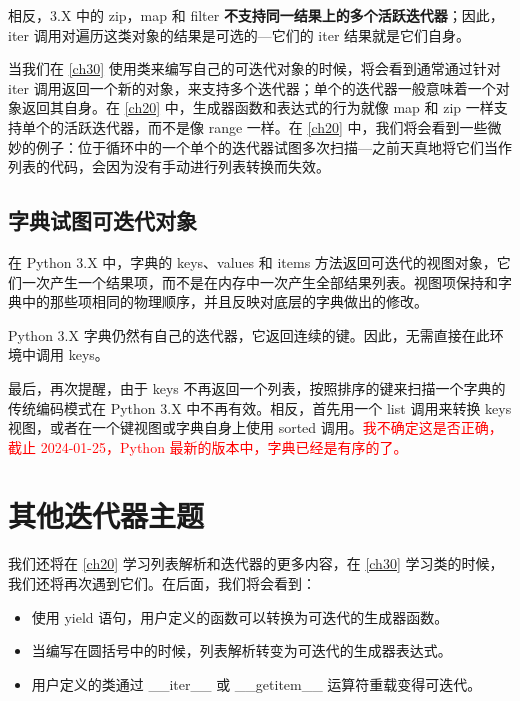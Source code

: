 相反，3.X 中的 zip，map 和 filter \textbf{不支持同一结果上的多个活跃迭代器}；因此，iter 调用对遍历这类对象的结果是可选的---它们的 iter 结果就是它们自身。

当我们在 \autoref{ch30} 使用类来编写自己的可迭代对象的时候，将会看到通常通过针对 iter 调用返回一个新的对象，来支持多个迭代器；单个的迭代器一般意味着一个对象返回其自身。在 \autoref{ch20} 中，生成器函数和表达式的行为就像 map 和 zip 一样支持单个的活跃迭代器，而不是像 range 一样。在 \autoref{ch20} 中，我们将会看到一些微妙的例子：位于循环中的一个单个的迭代器试图多次扫描---之前天真地将它们当作列表的代码，会因为没有手动进行列表转换而失效。
\subsection{字典试图可迭代对象}
在 Python 3.X 中，字典的 keys、values 和 items 方法返回可迭代的视图对象，它们一次产生一个结果项，而不是在内存中一次产生全部结果列表。视图项保持和字典中的那些项相同的物理顺序，并且反映对底层的字典做出的修改。

Python 3.X 字典仍然有自己的迭代器，它返回连续的键。因此，无需直接在此环境中调用 keys。

最后，再次提醒，由于 keys 不再返回一个列表，按照排序的键来扫描一个字典的传统编码模式在 Python 3.X 中不再有效。相反，首先用一个 list 调用来转换 keys 视图，或者在一个键视图或字典自身上使用 sorted 调用。\textcolor{red}{我不确定这是否正确，截止 2024-01-25，Python 最新的版本中，字典已经是有序的了。}
\section{其他迭代器主题}
我们还将在 \autoref{ch20} 学习列表解析和迭代器的更多内容，在 \autoref{ch30} 学习类的时候，我们还将再次遇到它们。在后面，我们将会看到：
\begin{itemize}
    \item 使用 yield 语句，用户定义的函数可以转换为可迭代的生成器函数。
    \item 当编写在圆括号中的时候，列表解析转变为可迭代的生成器表达式。
    \item 用户定义的类通过 \_\_iter\_\_ 或 \_\_getitem\_\_ 运算符重载变得可迭代。
\end{itemize}